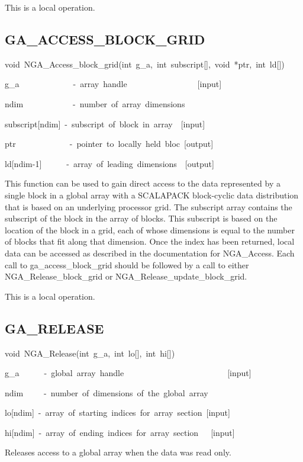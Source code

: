 This is a local operation. 


\subsection*{\label{sub:GA_ACCESS_BLOCK_GRID}GA\_ACCESS\_BLOCK\_GRID}
\begin{lyxcode}
void~NGA\_Access\_block\_grid(int~g\_a,~int~subscript{[}{]},~void~{*}ptr,~int~ld{[}{]})



g\_a~~~~~~~~~~~~~-~array~handle~~~~~~~~~~~~~~~~~{[}input{]}~

ndim~~~~~~~~~~~~-~number~of~array~dimensions~

subscript{[}ndim{]}~-~subscript~of~block~in~array~~{[}input{]}~

ptr~~~~~~~~~~~~~-~pointer~to~locally~held~bloc~{[}output{]}~

ld{[}ndim-1{]}~~~~~~-~array~of~leading~dimensions~~{[}output{]}
\end{lyxcode}
This function can be used to gain direct access to the data represented
by a single block in a global array with a SCALAPACK block-cyclic
data distribution that is based on an underlying processor grid. The
subscript array contains the subscript of the block in the array of
blocks. This subscript is based on the location of the block in a
grid, each of whose dimensions is equal to the number of blocks that
fit along that dimension. Once the index has been returned, local
data can be accessed as described in the documentation for NGA\_Access.
Each call to ga\_access\_block\_grid should be followed by a call
to either NGA\_Release\_block\_grid or NGA\_Release\_update\_block\_grid.

This is a local operation.


\subsection*{\label{sub:GA_RELEASE}GA\_RELEASE}
\begin{lyxcode}
void~NGA\_Release(int~g\_a,~int~lo{[}{]},~int~hi{[}{]})



g\_a~~~~~~-~global~array~handle~~~~~~~~~~~~~~~~~~~~~~~~~{[}input{]}~

ndim~~~~~-~number~of~dimensions~of~the~global~array~

lo{[}ndim{]}~-~array~of~starting~indices~for~array~section~{[}input{]}

hi{[}ndim{]}~-~array~of~ending~indices~for~array~section~~~{[}input{]}
\end{lyxcode}
Releases access to a global array when the data was read only.

